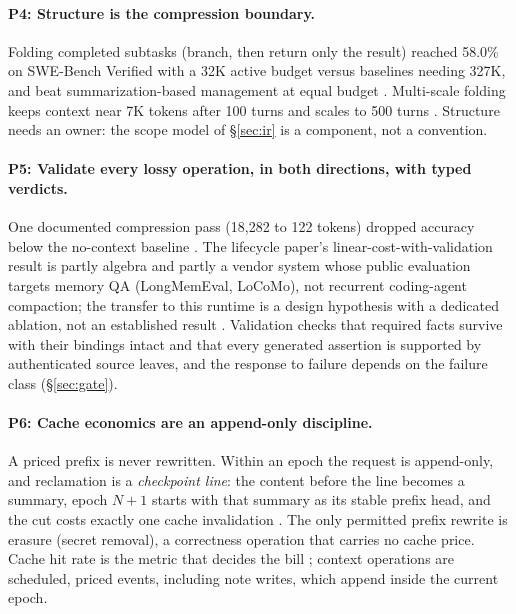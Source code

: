 \documentclass[11pt]{article}
\begin{document}
\paragraph{P4: Structure is the compression boundary.} Folding completed subtasks (branch, then return only the result) reached 58.0\% on SWE-Bench Verified with a 32K active budget versus baselines needing 327K, and beat summarization-based management at equal budget \cite{folding2026}. Multi-scale folding keeps context near 7K tokens after 100 turns and scales to 500 turns \cite{agentfold2026}. Structure needs an owner: the scope model of \S\ref{sec:ir} is a component, not a convention.

\paragraph{P5: Validate every lossy operation, in both directions, with typed verdicts.} One documented compression pass (18{,}282 to 122 tokens) dropped accuracy below the no-context baseline \cite{lifecycle2026}. The lifecycle paper's linear-cost-with-validation result is partly algebra and partly a vendor system whose public evaluation targets memory QA (LongMemEval, LoCoMo), not recurrent coding-agent compaction; the transfer to this runtime is a design hypothesis with a dedicated ablation, not an established result \cite{lifecycle2026}. Validation checks that required facts survive with their bindings intact and that every generated assertion is supported by authenticated source leaves, and the response to failure depends on the failure class (\S\ref{sec:gate}).

\paragraph{P6: Cache economics are an append-only discipline.} A priced prefix is never rewritten. Within an epoch the request is append-only, and reclamation is a \emph{checkpoint line}: the content before the line becomes a summary, epoch $N{+}1$ starts with that summary as its stable prefix head, and the cut costs exactly one cache invalidation \cite{anthropic2026docs,dream2026}. The only permitted prefix rewrite is erasure (secret removal), a correctness operation that carries no cache price. Cache hit rate is the metric that decides the bill \cite{dream2026}; context operations are scheduled, priced events, including note writes, which append inside the current epoch.
\end{document}

